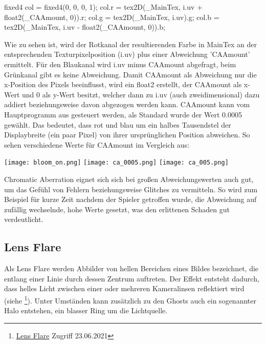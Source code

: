 \begin{hlsl}
    fixed4 col = fixed4(0, 0, 0, 1);
    col.r = tex2D(_MainTex, i.uv + float2(_CAAmount, 0)).r;
    col.g = tex2D(_MainTex, i.uv).g;
    col.b = tex2D(_MainTex, i.uv - float2(_CAAmount, 0)).b;
\end{hlsl}

Wie zu sehen ist, wird der Rotkanal der resultierenden Farbe in MainTex an der entsprechenden Texturpixelposition (i.uv) plus einer Abweichung 'CAAmount' ermittelt. Für den Blaukanal wird i.uv minus CAAmount abgefragt, beim Grünkanal gibt es keine Abweichung. Damit CAAmount als Abweichung nur die x-Position des Pixels beeinflusst, wird ein float2 erstellt, der CAAmount als x-Wert und 0 als y-Wert besitzt, welcher dann zu i.uv (auch zweidimensional) dazu addiert beziehungsweise davon abgezogen werden kann.
CAAmount kann vom Hauptprogramm aus gesteuert werden, als Standard wurde der Wert 0.0005 gewählt. Das bedeutet, dass rot und blau um ein halbes Tausendstel der Displaybreite (ein paar Pixel) von ihrer ursprünglichen Position abweichen. So sehen verschiedene Werte für CAAmount im Vergleich aus:

\captionsetup{type=figure}
\texttt{[image: bloom\_on.png]}
\texttt{[image: ca\_0005.png]}
\texttt{[image: ca\_005.png]}

Chromatic Aberration eignet sich sich bei gro{\ss}en Abweichungswerten auch gut, um das Gefühl von Fehlern beziehungsweise Glitches zu vermitteln. So wird zum Beispiel für kurze Zeit nachdem der Spieler getroffen wurde, die Abweichung auf zufällig wechselnde, hohe Werte gesetzt, was den erlittenen Schaden gut verdeutlicht.



\subsection{Lens Flare}

Als Lens Flare werden Abbilder von hellen Bereichen eines Bildes bezeichnet, die entlang einer Linie durch dessen Zentrum auftreten. Der Effekt entsteht dadurch, dass helles Licht zwischen einer oder mehreren Kameralinsen reflektiert wird (siehe \footnote{\href{https://de.wikipedia.org/wiki/Lens_Flare}{Lens Flare} Zugriff 23.06.2021}). Unter Umständen kann zusätzlich zu den Ghosts auch ein sogenannter Halo entstehen, ein blasser Ring um die Lichtquelle.

